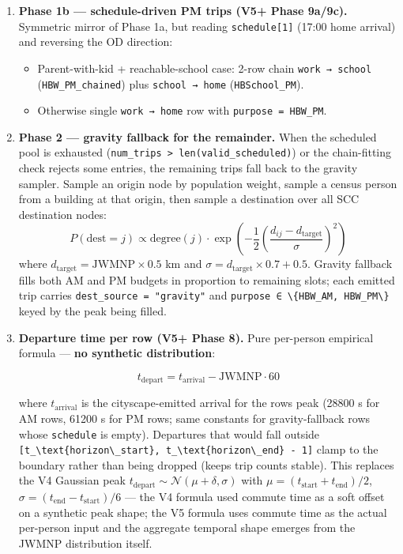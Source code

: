 \begin{enumerate}
  Continue until \texttt{n\_am\_target} is reached or the pool is
  exhausted.
\item
  \textbf{Phase 1b --- schedule-driven PM trips (V5+ Phase 9a/9c).}
  Symmetric mirror of Phase 1a, but reading \texttt{schedule{[}1{]}}
  (17:00 home arrival) and reversing the OD direction:

  \begin{itemize}
  \tightlist
  \item
    Parent-with-kid + reachable-school case: 2-row chain
    \texttt{work\ →\ school} (\texttt{HBW\_PM\_chained}) plus
    \texttt{school\ →\ home} (\texttt{HBSchool\_PM}).
  \item
    Otherwise single \texttt{work\ →\ home} row with
    \texttt{purpose\ =\ HBW\_PM}.
  \end{itemize}
\item
  \textbf{Phase 2 --- gravity fallback for the remainder.} When the
  scheduled pool is exhausted
  (\texttt{num\_trips\ \textgreater{}\ len(valid\_scheduled)}) or the
  chain-fitting check rejects some entries, the remaining trips fall
  back to the gravity sampler. Sample an origin node by population
  weight, sample a census person from a building at that origin, then
  sample a destination over all SCC destination nodes:
  \[P(\text{dest} = j) \propto \text{degree}(j) \cdot \exp\left(-\frac{1}{2}\left(\frac{d_{ij} - d_\text{target}}{\sigma}\right)^2\right)\]
  where \(d_\text{target} = \text{JWMNP} \times 0.5\) km and
  \(\sigma = d_\text{target} \times 0.7 + 0.5\). Gravity fallback fills
  both AM and PM budgets in proportion to remaining slots; each emitted
  trip carries \texttt{dest\_source\ =\ "gravity"} and
  \texttt{purpose\ ∈\ \textbackslash{}\{HBW\_AM,\ HBW\_PM\textbackslash{}\}}
  keyed by the peak being filled.
\item
  \textbf{Departure time per row (V5+ Phase 8).} Pure per-person
  empirical formula --- \textbf{no synthetic distribution}:

  \[t_\text{depart} = t_\text{arrival} - \text{JWMNP} \cdot 60\]

  where \(t_\text{arrival}\) is the cityscape-emitted arrival for the
  row\textquotesingle s peak (28800 s for AM rows, 61200 s for PM rows;
  same constants for gravity-fallback rows whose \texttt{schedule} is
  empty). Departures that would fall outside
  \texttt{{[}t\_\textbackslash{}text\{horizon\textbackslash{}\_start\},\ t\_\textbackslash{}text\{horizon\textbackslash{}\_end\}\ -\ 1{]}}
  clamp to the boundary rather than being dropped (keeps trip counts
  stable). This replaces the V4 Gaussian peak
  \(t_\text{depart} \sim \mathcal{N}(\mu + \delta, \sigma)\) with
  \(\mu = (t_\text{start} + t_\text{end})/2\),
  \(\sigma = (t_\text{end} - t_\text{start})/6\) --- the V4 formula used
  commute time as a soft offset on a synthetic peak shape; the V5
  formula uses commute time as the actual per-person input and the
  aggregate temporal shape emerges from the JWMNP distribution itself.


\end{enumerate}
